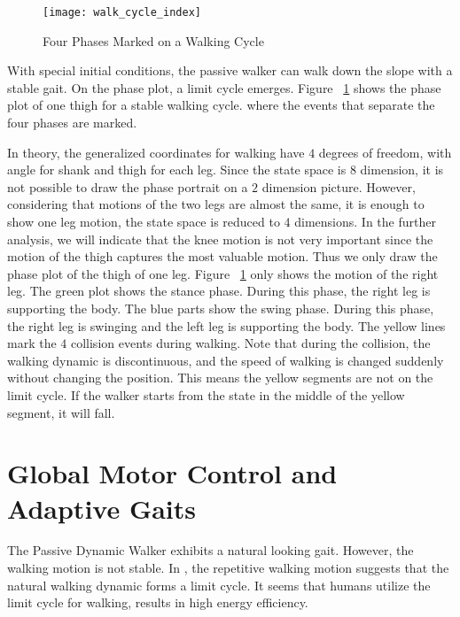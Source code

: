 \begin{figure}[!htbp]
  \begin{center}
    \texttt{[image: walk\_cycle\_index]}
    \caption{Four Phases Marked on a Walking Cycle}
    \label{fig:phasesmaker}
\end{center}
\end{figure}

With special initial conditions, the passive walker can walk down the slope with a stable gait.
On the phase plot,  a limit cycle emerges. 
Figure ~\ref{fig:phasesmaker} shows the phase plot of one thigh for a stable walking cycle.
where the events that separate the four phases are marked. 

In theory, the generalized coordinates for walking have $4$ degrees of freedom, with angle for shank and thigh for each leg.
Since the state space is $8$ dimension, it is not possible to draw the phase portrait on a $2$ dimension picture.
However, considering that motions of the two legs are almost the same, it is enough to show one leg motion, the state space is reduced to $4$ dimensions.
In the further analysis, we will indicate that the knee motion is not very important since the motion of the thigh captures the most valuable motion.
Thus we only draw the phase plot of the thigh of one leg.
Figure ~\ref{fig:phasesmaker} only shows the motion of the right leg.
The green plot shows the stance phase. 
During this phase, the right leg is supporting the body.
The blue parts show the swing phase.
During this phase,  the right leg is swinging and the left leg is supporting the body.
The yellow lines mark the $4$ collision events during walking.
Note that during the collision, the walking dynamic is discontinuous, and the speed of walking is changed suddenly without changing the position.
This means the yellow segments are not on the limit cycle. 
If the walker starts from the state in the middle of the yellow segment, it will fall.











\section{Global Motor Control and Adaptive Gaits}
The Passive Dynamic Walker exhibits a natural looking gait.
However, the walking motion is not stable.
In \moit, the repetitive walking motion suggests that the natural walking dynamic forms a limit cycle.
It seems that humans utilize the limit cycle for walking,  results in high energy efficiency.

